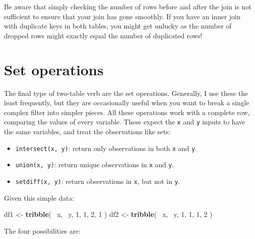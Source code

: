 \documentclass[]{book}
\newenvironment{Shaded}{\begin{snugshade}}{\end{snugshade}}
\newcommand{\KeywordTok}[1]{\textcolor[rgb]{0.13,0.29,0.53}{\textbf{{#1}}}}
\newcommand{\DecValTok}[1]{\textcolor[rgb]{0.00,0.00,0.81}{{#1}}}
\newcommand{\StringTok}[1]{\textcolor[rgb]{0.31,0.60,0.02}{{#1}}}
\newcommand{\NormalTok}[1]{{#1}}
\providecommand{\tightlist}{%
  \setlength{\itemsep}{0pt}\setlength{\parskip}{0pt}}
\begin{document}
Be aware that simply checking the number of rows before and after the
join is not sufficient to ensure that your join has gone smoothly. If
you have an inner join with duplicate keys in both tables, you might get
unlucky as the number of dropped rows might exactly equal the number of
duplicated rows!

\section{Set operations}\label{set-operations}

The final type of two-table verb are the set operations. Generally, I
use these the least frequently, but they are occasionally useful when
you want to break a single complex filter into simpler pieces. All these
operations work with a complete row, comparing the values of every
variable. These expect the \texttt{x} and \texttt{y} inputs to have the
same variables, and treat the observations like sets:

\begin{itemize}
\tightlist
\item
  \texttt{intersect(x,\ y)}: return only observations in both \texttt{x}
  and \texttt{y}.
\item
  \texttt{union(x,\ y)}: return unique observations in \texttt{x} and
  \texttt{y}.
\item
  \texttt{setdiff(x,\ y)}: return observations in \texttt{x}, but not in
  \texttt{y}.
\end{itemize}

Given this simple data:

\begin{Shaded}
\begin{Highlighting}[]
\NormalTok{df1 <-}\StringTok{ }\KeywordTok{tribble}\NormalTok{(}
  \NormalTok{~x, ~y,}
   \DecValTok{1}\NormalTok{,  }\DecValTok{1}\NormalTok{,}
   \DecValTok{2}\NormalTok{,  }\DecValTok{1}
\NormalTok{)}
\NormalTok{df2 <-}\StringTok{ }\KeywordTok{tribble}\NormalTok{(}
  \NormalTok{~x, ~y,}
   \DecValTok{1}\NormalTok{,  }\DecValTok{1}\NormalTok{,}
   \DecValTok{1}\NormalTok{,  }\DecValTok{2}
\NormalTok{)}
\end{Highlighting}
\end{Shaded}

The four possibilities are:
\end{document}
